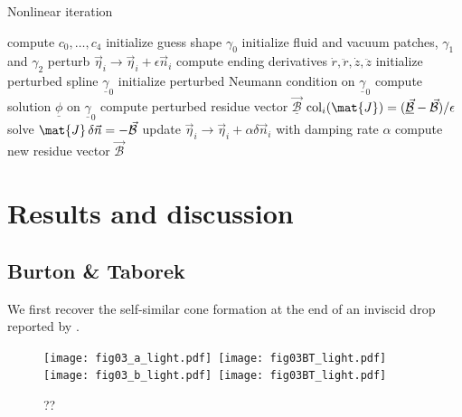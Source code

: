 \documentclass{jfm}
\begin{document}
\begin{algorithm}
  \caption{Nonlinear iteration \label{alg:taylorConeNewton}}
  \begin{algorithmic}[1]
     
    \State compute $c_0,\dots , c_4$ 
    \State initialize guess shape $\gamma_0$
    \State initialize fluid and vacuum patches, $\gamma_1$ and $\gamma_2$
     
     
    \State perturb $\vec{\eta}_i \to \vec{\eta}_i+\epsilon \vec{n}_i$
    \State compute ending derivatives $\dot{r},\ddot{r},\dot{z},\ddot{z}$
    \State initialize perturbed spline $\underline{\gamma}_0$    
     \State initialize perturbed Neumann condition on $\underline{\gamma}_0$    
    \State compute solution $\underline{\phi}$ on $\underline{\gamma}_0$    
     \State compute perturbed residue vector $\underline{\vec{\mathcal{B}}}$ 
     \State $\mathrm{col}_i(\mat{J}) = (\underline{\vec{\mathcal{B}}}-\vec{\mathcal{B}})/\epsilon$
    \EndFor
    \State solve $\mat{J}\, \delta\vec{n}=-\vec{\mathcal{B}}$ 
    \State update $\vec{\eta}_i \to \vec{\eta}_i+\alpha \delta\vec{n}_i$ with damping rate $\alpha$
    \State compute new residue vector $\vec{\mathcal{B}}$
    \EndWhile        
    \EndFunction
  \end{algorithmic}
\end{algorithm}


\section{Results and discussion}
\subsection{Burton \& Taborek}
We first recover the self-similar cone formation at the end of an inviscid drop reported by
\cite{Burton11}.
\begin{figure}  
  \texttt{[image: fig03\_a\_light.pdf]}\,
  \texttt{[image: fig03BT\_light.pdf]}\\[5pt]
  \texttt{[image: fig03\_b\_light.pdf]}\,
  \texttt{[image: fig03BT\_light.pdf]}
  \caption{\cite{Burton11}
??\label{fig:??}
}
\end{figure}















\end{document}
